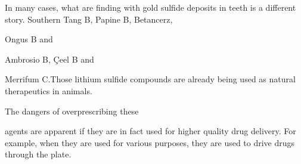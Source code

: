 \documentclass{article}
\begin{document}
In many cases, what are finding with gold sulfide deposits in teeth is a different story. Southern Tang B, Papine B, Betancerz,

Ongus B and

Ambrosio B, Çeel B and

Merrifum C.Those lithium sulfide compounds are already being used as natural therapeutics in animals.

The dangers of overprescribing these

agents are apparent if they are in fact used for higher quality drug delivery. For example, when they are used for various purposes, they are used to drive drugs through the plate.
\end{document}
